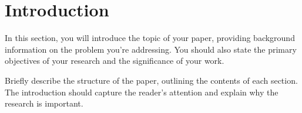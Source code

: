 \section{Introduction}

In this section, \cite{smith2020}you will introduce the topic of your paper, providing background information on the problem you're addressing. You should also state the primary objectives of your research and the significance of your work. 

Briefly describe the structure of the paper, outlining the contents of each section. The introduction should capture the reader's attention and explain why the research is important.

